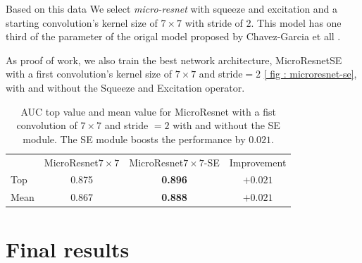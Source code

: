 \documentclass[../document.tex]{subfiles}
\begin{document}
Based on this data We select \emph{micro-resnet} with squeeze and excitation and a starting convolution's kernel size of $7\times7$ with stride of $2$. This model has one third of the parameter of the origal model proposed by Chavez-Garcia et all \cite{omar2018traversability}. 

As proof of work, we also train the best network architecture, MicroResnetSE with a first convolution's kernel size of $7 \times 7$ and stride$=2$ \ref{ fig : microresnet-se}, with and without the Squeeze and Excitation operator.
\begin{table} [htbp]
  \centering
  \begin{tabular}{@{}lccc@{}}
  \toprule
  &  MicroResnet$7\times7$ & MicroResnet$7\times7$-SE  & Improvement \\
  \cline{1-4}
   Top & 0.875 & \textbf{0.896} & $+0.021$ \\
   Mean & 0.867 & \textbf{0.888} & $+0.021$ \\
  \bottomrule   
\end{tabular}
\caption{AUC top value and mean value for MicroResnet with a fist convolution of $7\times7$ and stride $=2$ with and without the SE module. The SE module boosts the performance by $0.021$.}
\end{table}

\section{Final results}
\end{document}
